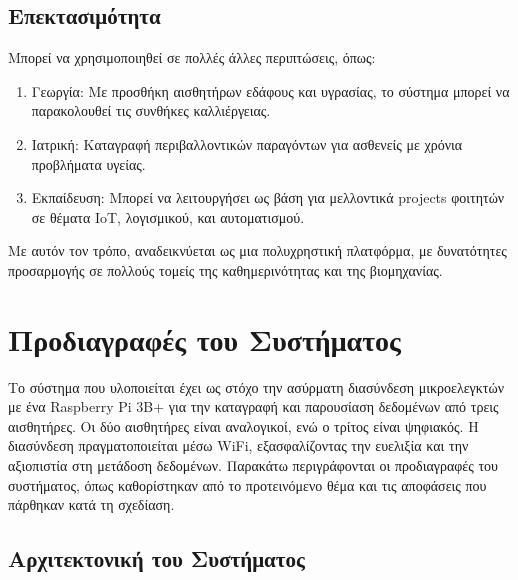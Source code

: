 \documentclass[conference]{IEEEtran}
\begin{document}
\subsection{Επεκτασιμότητα}

Μπορεί να χρησιμοποιηθεί σε πολλές άλλες περιπτώσεις, όπως:
\begin{enumerate}
	\item Γεωργία: Με προσθήκη αισθητήρων εδάφους και υγρασίας, το σύστημα μπορεί να παρακολουθεί τις συνθήκες καλλιέργειας.
	\item Ιατρική:  Καταγραφή περιβαλλοντικών παραγόντων για ασθενείς με χρόνια προβλήματα υγείας.
	\item Εκπαίδευση: Μπορεί να λειτουργήσει ως βάση για μελλοντικά projects φοιτητών σε θέματα IoT, λογισμικού, και αυτοματισμού.
\end{enumerate}

Με αυτόν τον τρόπο, αναδεικνύεται ως μια πολυχρηστική πλατφόρμα, με δυνατότητες προσαρμογής σε πολλούς τομείς της καθημερινότητας και της βιομηχανίας.

\section{Προδιαγραφές του Συστήματος}

Το σύστημα που υλοποιείται έχει ως στόχο την ασύρματη διασύνδεση μικροελεγκτών με ένα Raspberry Pi 3B+ για την καταγραφή και παρουσίαση δεδομένων από τρεις αισθητήρες. Οι δύο αισθητήρες είναι αναλογικοί, ενώ ο τρίτος είναι ψηφιακός. Η διασύνδεση πραγματοποιείται μέσω WiFi, εξασφαλίζοντας την ευελιξία και την αξιοπιστία στη μετάδοση δεδομένων. Παρακάτω περιγράφονται οι προδιαγραφές του συστήματος, όπως καθορίστηκαν από το προτεινόμενο θέμα και τις αποφάσεις που πάρθηκαν κατά τη σχεδίαση.

\subsection{Αρχιτεκτονική του Συστήματος}
\end{document}
